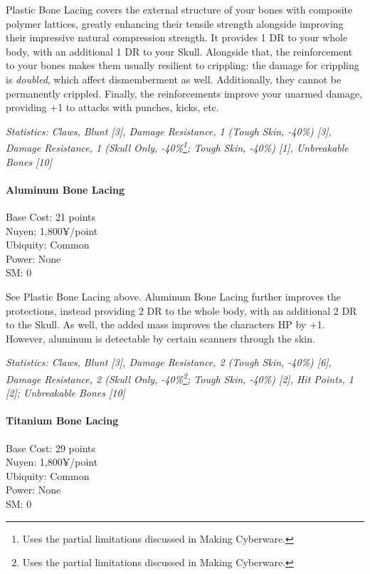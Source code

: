 \begin{multicols*}{3}
	Plastic Bone Lacing covers the external structure of your bones with composite polymer lattices, greatly enhancing their tensile strength alongside improving their impressive natural compression strength. It provides 1 DR to your whole body, with an additional 1 DR to your Skull. Alongside that, the reinforcement to your bones makes them usually resilient to crippling: the damage for crippling is \textit{doubled}, which affect dismemberment as well. Additionally, they cannot be permanently crippled. Finally, the reinforcements improve your unarmed damage, providing +1 to attacks with punches, kicks, etc.
	
	\textit{\textcolor{OliveGreen}{Statistics: Claws, Blunt [3], Damage Resistance, 1 (Tough Skin, -40\%) [3], Damage Resistance, 1 (Skull Only, -40\%\footnote {Uses the partial limitations discussed in Making Cyberware.}; Tough Skin, -40\%) [1], Unbreakable Bones [10]}}
	
	\paragraph{Aluminum Bone Lacing}
	\begin{flushright}
		Base Cost: 21 points\\
		Nuyen: 1,800¥/point\\
		Ubiquity: Common\\
		Power: None\\
		SM: 0
	\end{flushright}
	
	See Plastic Bone Lacing above. Aluminum Bone Lacing further improves the protections, instead providing 2 DR to the whole body, with an additional 2 DR to the Skull. As well, the added mass improves the characters HP by +1. However, aluminum is detectable by certain scanners through the skin.
	
	\textit{\textcolor{OliveGreen}{Statistics: Claws, Blunt [3], Damage Resistance, 2 (Tough Skin, -40\%) [6], Damage Resistance, 2 (Skull Only, -40\%\footnote {Uses the partial limitations discussed in Making Cyberware.}; Tough Skin, -40\%) [2], Hit Points, 1 [2]; Unbreakable Bones [10]}}
	
	\paragraph{Titanium Bone Lacing}
	\begin{flushright}
		Base Cost: 29 points\\
		Nuyen: 1,800¥/point\\
		Ubiquity: Common\\
		Power: None\\
		SM: 0
	\end{flushright}
	

\end{multicols*}
